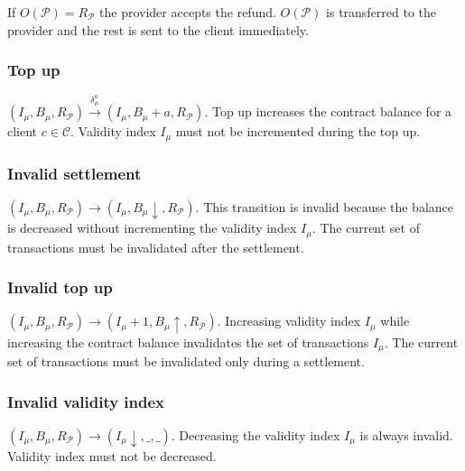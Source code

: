 \documentclass{llncs}
\begin{document}
If $O(\mathcal{P}) = R_\mathcal{P}$ the provider accepts the refund. $O(\mathcal{P})$ is transferred to the provider and the rest is sent to the client immediately.

\subsubsection{Top up} $(I_\mu, B_\mu,R_\mathcal{P}) \xrightarrow{\delta_\mu^a} (I_\mu, B_\mu+a,R_\mathcal{P})$. Top up increases the contract balance for a client $c \in \mathcal{C}$. Validity index $I_\mu$ must not be incremented during the top up.

\subsubsection{Invalid settlement} $(I_\mu, B_\mu,R_\mathcal{P}) \rightarrow (I_\mu, B_\mu\downarrow,R_\mathcal{P})$. This transition is invalid because the balance is decreased without incrementing the validity index $I_\mu$. The current set of transactions must be invalidated after the settlement.

\subsubsection{Invalid top up} $(I_\mu, B_\mu,R_\mathcal{P}) \rightarrow (I_\mu+1, B_\mu\uparrow,R_\mathcal{P})$. Increasing validity index $I_\mu$ while increasing the contract balance invalidates the set of transactions $I_\mu$. The current set of transactions must be invalidated only during a settlement.

\subsubsection{Invalid validity index} $(I_\mu, B_\mu,R_\mathcal{P}) \rightarrow (I_\mu\downarrow, \_, \_)$. Decreasing the validity index $I_\mu$ is always invalid. Validity index must not be decreased.
\end{document}
